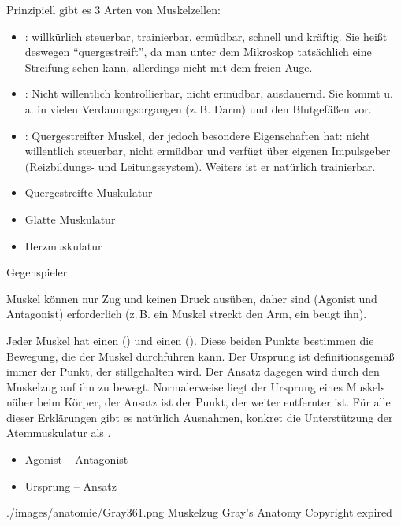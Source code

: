  
{%
}

{
Prinzipiell gibt es 3  Arten von Muskelzellen:

\begin{itemize}
  \item {}:
  willkürlich steuerbar, trainierbar, er\-müd\-bar,  schnell und
  kräftig. Sie heißt deswegen
  \enquote{quergestreift}, da man unter dem
  Mikroskop tatsächlich eine Streifung sehen kann, allerdings nicht mit
  dem freien Auge.
  \item {}: Nicht willentlich
  kontrollierbar, nicht ermüdbar, ausdauernd.
  Sie kommt u.\,a. in vielen
  Verdauungsorgangen (z.\,B. Darm) und den Blutgefäßen vor.
  \item {}: Quergestreifter Muskel, der
  jedoch besondere Eigenschaften hat: nicht willentlich
  steuerbar, nicht ermüdbar und verfügt über eigenen
  Impulsgeber (Reizbildungs- und Leitungssystem). 
  Weiters ist er natürlich trainierbar.
\end{itemize}

}
{
\begin{itemize}
  \item Quergestreifte Muskulatur
  \item Glatte Muskulatur
  \item Herzmuskulatur
\end{itemize}
}
{}{}{}


\TextSlidePicture
{Gegenspieler}%
{%
Muskel können nur Zug und keinen
Druck ausüben, daher sind  (Agonist und
Antagonist) erforderlich (z.\,B. ein Muskel streckt den Arm,
ein  beugt ihn).

Jeder Muskel hat einen 
() und einen
 ().
Diese beiden Punkte bestimmen die Bewegung, die der Muskel
durchführen kann. Der Ursprung ist definitionsgemäß immer
der Punkt, der stillgehalten wird. Der Ansatz dagegen wird
durch den Muskelzug auf ihn zu bewegt. Normalerweise liegt
der Ursprung eines Muskels näher beim Körper, der Ansatz ist
der Punkt, der weiter entfernter ist. Für alle dieser
Erklärungen gibt es natürlich Ausnahmen, konkret die
Unterstützung der Atemmuskulatur als
.}%
{
\begin{itemize}
  \item Agonist -- Antagonist
  \item Ursprung -- Ansatz
\end{itemize}}%
{./images/anatomie/Gray361.png}%
{Muskelzug}%
{}%
{Gray's Anatomy}%
{Copyright expired}%


